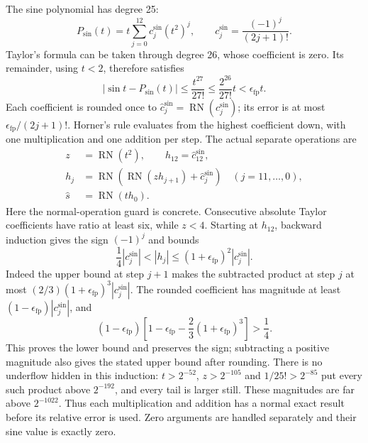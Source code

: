 The sine polynomial has degree 25:
\[
 P_{\mathrm{sin}}(t)
  =t\sum_{j=0}^{12}c_j^{\mathrm{sin}}(t^2)^j,
 \qquad c_j^{\mathrm{sin}}=\frac{(-1)^j}{(2j+1)!}.
\]
Taylor's formula can be taken through degree 26, whose coefficient is
zero. Its remainder, using $t<2$, therefore satisfies
\[
 |\sin t-P_{\mathrm{sin}}(t)|
 \leq\frac{t^{27}}{27!}
 \leq\frac{2^{26}}{27!}t<\epsilon_{\mathrm{fp}}t.
\]
Each coefficient is rounded once to
$\widehat c_j^{\mathrm{sin}}=\operatorname{RN}(c_j^{\mathrm{sin}})$;
its error is at most $\epsilon_{\mathrm{fp}}/(2j+1)!$.
Horner's rule evaluates from the highest coefficient down, with one
multiplication and one addition per step. The actual separate operations are
\[
 \begin{aligned}
 z&=\operatorname{RN}(t^2),\qquad h_{12}=\widehat c_{12}^{\mathrm{sin}},\\
 h_j&=\operatorname{RN}\!\left(
           \operatorname{RN}(z h_{j+1})+\widehat c_j^{\mathrm{sin}}\right)
                  \quad(j=11,\ldots,0),\\
 \widehat s&=\operatorname{RN}(t h_0).
 \end{aligned}
\]
Here the normal-operation guard is concrete. Consecutive absolute
Taylor coefficients have ratio at least six, while $z<4$.
Starting at $h_{12}$, backward induction gives the sign
$(-1)^j$ and bounds
\[
 \frac14|c_j^{\mathrm{sin}}|<|h_j|
       \leq(1+\epsilon_{\mathrm{fp}})^2|c_j^{\mathrm{sin}}|.
\]
Indeed the upper bound at step $j+1$ makes the subtracted product
at step $j$ at most
$(2/3)(1+\epsilon_{\mathrm{fp}})^3|c_j^{\mathrm{sin}}|$.
The rounded coefficient has magnitude at least
$(1-\epsilon_{\mathrm{fp}})|c_j^{\mathrm{sin}}|$, and
\[
 (1-\epsilon_{\mathrm{fp}})
 \left[1-\epsilon_{\mathrm{fp}}
                  -\frac23(1+\epsilon_{\mathrm{fp}})^3\right]>\frac14.
\]
This proves the lower bound and preserves the sign; subtracting a
positive magnitude also gives the stated upper bound after rounding.
There is no underflow hidden in this induction: $t>2^{-52}$,
$z>2^{-105}$ and $1/25!>2^{-85}$ put every such product above
$2^{-192}$, and every tail is larger still. These magnitudes are
far above $2^{-1022}$. Thus each multiplication and addition has a
normal exact result before its relative error is used. Zero arguments
are handled separately and their sine value is exactly zero.

